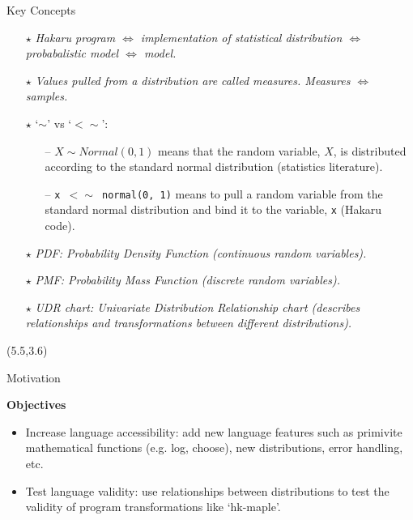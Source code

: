 \documentclass[22pt]{beamer}
\begin{document}
\begin{frame}[fragile]
\begin{textblock}{5}
\begin{block}{\Large{Key Concepts}}
\justifying

\scriptsize{
\begin{itemize}
  \item[\textbf{$\star$}] \textit{Hakaru program $\Longleftrightarrow$ implementation of statistical distribution $\Longleftrightarrow$ probabalistic model $\Longleftrightarrow$ model.}
  \item[\textbf{$\star$}] \textit{Values pulled from a distribution are called measures. Measures $\Longleftrightarrow$ samples.}
  \item[\textbf{$\star$}] `{\textbf{$\sim$}}' vs `{\textbf{$<\sim$}}':
      \begin{itemize}
          \tiny
          \item[--] \tiny{$X \sim Normal(0, 1)$ means that the random variable, $X$, is distributed according to the standard normal distribution (statistics literature).}
          \item[--] \tiny{{\tt \tiny{x $<\sim$ normal(0, 1)}} means to pull a random variable from the standard normal distribution and bind it to the variable, {\tt \tiny{x}} (Hakaru code).}
      \end{itemize}
  \item[\textbf{$\star$}] \textit{PDF: Probability Density Function (continuous random variables).}
  \item[\textbf{$\star$}] \textit{PMF: Probability Mass Function (discrete random variables).}
  \item[\textbf{$\star$}] \textit{UDR chart: Univariate Distribution Relationship chart (describes relationships and transformations between different distributions).}
\end{itemize}
}
\end{block}


\begin{textblock}{5}(5.5,3.6)



\begin{block}{\Large{Motivation}}
\justifying


\normalsize{\textbf{Objectives}}

\scriptsize{
\begin{itemize}
  \item Increase language accessibility: add new language features such as primivite mathematical functions (e.g. log, choose), new distributions, error handling, etc.
  \item Test language validity: use relationships between distributions to test the validity of program transformations like `hk-maple'. 
\end{itemize}
}


\end{block}
\end{textblock}
\end{textblock}
\end{frame}
\end{document}
